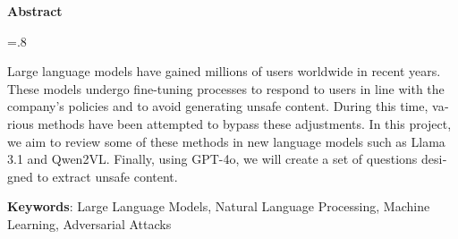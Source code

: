 

\begin{latin}

    \begin{center}
    \textbf{Abstract}
    \end{center}
    \baselineskip=.8\baselineskip
    
    Large language models have gained millions of users worldwide in recent years. These models undergo fine-tuning processes to respond to users in line with the company’s policies and to avoid generating unsafe content. During this time, various methods have been attempted to bypass these adjustments. In this project, we aim to review some of these methods in new language models such as Llama 3.1 and Qwen2VL.
    Finally, using GPT-4o, we will create a set of questions designed to extract unsafe content.
    
    \bigskip\noindent\textbf{Keywords}:
    Large Language Models, Natural Language Processing, Machine Learning, Adversarial Attacks
    
    \end{latin}
    